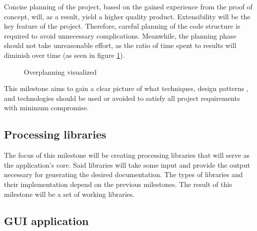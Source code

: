 Concise planning of the project, based on the gained experience from the proof of concept, will, as a result, yield a higher quality product.
Extensibility will be the key feature of the project. Therefore, careful planning of the code structure is required to avoid unnecessary complications.
Meanwhile, the planning phase should not take unreasonable effort, as the ratio of time spent to results will diminish over time (as seen in figure \ref{fig:overplanning}). \cite{ruparelia_stop_2016}

\begin{figure}[H]
    \centering
    \caption{Overplanning visualized}
    \label{fig:overplanning}
\end{figure}

This milestone aims to gain a clear picture of what techniques, design patterns \cite{humblot_design_2021}, and technologies should be used or avoided to satisfy all project requirements with minimum compromise.

\subsection*{Processing libraries} \label{subSecProcessingLibs}

The focus of this milestone will be creating processing libraries that will serve as the application's core. Said libraries will take some input and provide the output necessary for generating the desired documentation. The types of libraries and their implementation depend on the previous milestones. The result of this milestone will be a set of working libraries.

\subsection*{GUI application} \label{subSecGuiApp}

